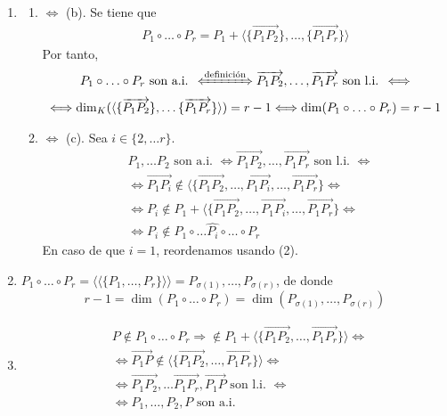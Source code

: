 \documentclass[12pt, a4paper, ones, notitlepage, openany,titlepage]{article}
\begin{document}
\begin{enumerate}[label=(\arabic*)]
	\item \begin{enumerate}[label=(\alph*)]
		\item $\Longleftrightarrow$ (b). Se tiene que
		\begin{gather*}
			P_1 \circ \ldots \circ P_r = P_1 + \langle \{\overrightarrow{P_1 P_2}\}, \ldots, \{\overrightarrow{P_1 P_r}\} \rangle
		\end{gather*}
		Por tanto,
		\begin{gather*}
			P_1 \circ \ldots \circ P_r \text{ son a.i. } \xLeftrightarrow{\text{definición}} \overrightarrow{P_1 P_2}, \ldots, \overrightarrow{P_1 P_r} \text{ son l.i. } \Longleftrightarrow \\ \Longleftrightarrow \dim_K (\langle \{\overrightarrow{P_1 P_2}\}, \ldots \{\overrightarrow{P_1 P_r}\}\rangle) = r - 1 \Longleftrightarrow \dim(P_1 \circ \ldots \circ P_r) = r - 1
		\end{gather*}
		\item $\Longleftrightarrow$ (c). Sea $i \in \{2, \ldots r\}$.
		$$
		\begin{aligned}
			& P_1, \ldots P_2 \text{ son a.i. } \Longleftrightarrow \overrightarrow{P_1 P_2}, \ldots, \overrightarrow{P_1 P_r} \text{ son l.i. } \Longleftrightarrow \\
			& \Longleftrightarrow \overrightarrow{P_1 P_i} \notin \langle \{\overrightarrow{P_1 P_2}, \ldots, \overrightarrow{P_1 P_i}, \ldots, \overrightarrow{P_1 P_r}\} \Longleftrightarrow \\
			& \Longleftrightarrow P_i \notin P_1 + \langle \{\overrightarrow{P_1 P_2}, \ldots, \overrightarrow{P_1 P_i}, \ldots, \overrightarrow{P_1 P_r}\} \Longleftrightarrow \\
			& \Longleftrightarrow P_i \notin P_1 \circ \ldots \widehat{P_i} \circ \ldots \circ P_r
		\end{aligned}
		$$
		En caso de que $i = 1$, reordenamos usando (2).
	\end{enumerate}

	\item $P_1 \circ \ldots \circ P_r = \langle\langle \{P_1, \ldots, P_r\} \rangle\rangle = P_{\sigma(1)}, \ldots, P_{\sigma(r)}$, de donde
	$$
	r - 1 = \dim(P_1 \circ \ldots \circ P_r) = \dim(P_{\sigma(1)}, \ldots, P_{\sigma(r)})
	$$
	
	\item
	$$
	\begin{aligned}
	& P \notin P_1 \circ \ldots \circ P_r \Longrightarrow \notin P_1 + \langle \{\overrightarrow{P_1 P_2}, \ldots, \overrightarrow{P_1 P_r}\} \rangle \Longleftrightarrow \\
	& \Longleftrightarrow \overrightarrow{P_1 P} \notin \langle \{\overrightarrow{P_1 P_2}, \ldots, \overrightarrow{P_1 P_r}\} \rangle \Longleftrightarrow \\
	& \Longleftrightarrow \overrightarrow{P_1 P_2}, \ldots \overrightarrow{P_1 P_r}, \overrightarrow{P_1 P} \text{ son l.i. } \Longleftrightarrow \\
	& \Longleftrightarrow P_1, \ldots, P_2, P \text{ son a.i. }
	\end{aligned}
	$$


\end{enumerate}
\end{document}
